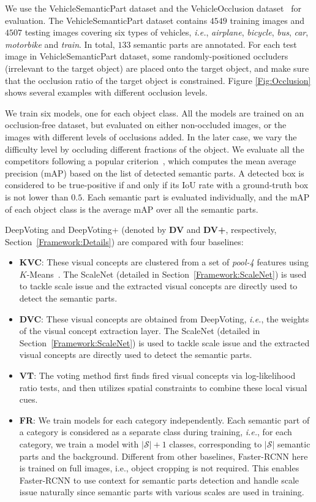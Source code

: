 \documentclass[10pt,twocolumn,letterpaper]{article}
\begin{document}
  We use the  VehicleSemanticPart dataset and the VehicleOcclusion dataset~\cite{wang2017detecting} for evaluation. The VehicleSemanticPart dataset contains $4549$ training images and $4507$ testing images covering six types of vehicles, {\em i.e.}, {\em airplane}, {\em bicycle}, {\em bus}, {\em car}, {\em motorbike} and {\em train}. In total, $133$ semantic parts are annotated. For each test image in VehicleSemanticPart dataset, some randomly-positioned occluders (irrelevant to the target object) are placed onto the target object, and make sure that the occlusion ratio of the target object is constrained. Figure \ref{Fig:Occlusion} shows several examples with different occlusion levels.

  We train six models, one for each object class. All the models are trained on an occlusion-free dataset, but evaluated on either non-occluded images, or the images with different levels of occlusions added. In the later case, we vary the difficulty level by occluding different fractions of the object. We evaluate all the competitors following a popular criterion~\cite{Everingham_2010_PASCAL}, which computes the mean average precision (mAP) based on the list of detected semantic parts. A detected box is considered to be true-positive if and only if its IoU rate with a ground-truth box is not lower than $0.5$. Each semantic part is evaluated individually, and the mAP of each object class is the average mAP over all the semantic parts.

  DeepVoting and DeepVoting+ (denoted by {\bf DV} and {\bf DV+}, respectively, Section~\ref{Framework:Details}) are compared with four baselines:
  \begin{itemize}
  \item {\bf KVC}: These visual concepts are clustered from a set of {\em pool-4} features using $K$-Means~\cite{Wang_2017_VC_journal}. The ScaleNet (detailed in Section~\ref{Framework:ScaleNet}) is used to tackle scale issue and the extracted visual concepts are directly used to detect the semantic parts.
  \item {\bf DVC}: These visual concepts are obtained from DeepVoting, {\em i.e.}, the weights of the visual concept extraction layer. The ScaleNet (detailed in Section~\ref{Framework:ScaleNet}) is used to tackle scale issue and the extracted visual concepts are directly used to detect the semantic parts.
  \item {\bf VT}: The voting method first finds fired visual concepts via log-likelihood ratio tests, and then utilizes spatial constraints to combine these local visual cues.
  \item {\bf FR}:   We train models for each category independently. Each semantic part of a category is considered as a separate class during training, {\em i.e.}, for each category, we train a model with $\left|\mathcal{S}\right|+1$ classes, corresponding to $\left|\mathcal{S}\right|$ semantic parts and the background. Different from other baselines, Faster-RCNN here is trained on full images, {i.e.}, object cropping is not required. This enables Faster-RCNN to use context for semantic parts detection and handle scale issue naturally since semantic parts with various scales are used in training.
  \end{itemize}
\end{document}
